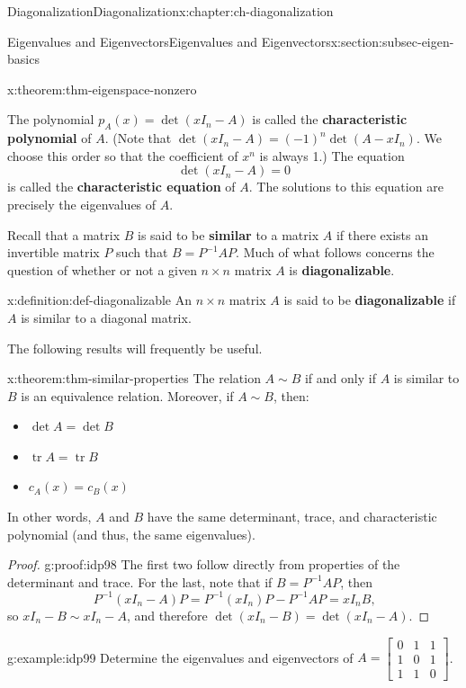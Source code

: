 \documentclass[oneside,10pt,]{book}
\newcommand{\terminology}[1]{\textbf{#1}}
\numberwithin{equation}{section}
\newcommand{\bbm}{\begin{bmatrix}}
\newcommand{\ebm}{\end{bmatrix}}
\newcommand{\tr}{\operatorname{tr}}
\newcommand{\amp}{&}
\begin{document}
\begin{chapterptx}{Diagonalization}{}{Diagonalization}{}{}{x:chapter:ch-diagonalization}
\begin{sectionptx}{Eigenvalues and Eigenvectors}{}{Eigenvalues and Eigenvectors}{}{}{x:section:subsec-eigen-basics}
\begin{theorem}{}{}{x:theorem:thm-eigenspace-nonzero}
%
\end{theorem}
The polynomial \(p_A(x)=\det(xI_n -A)\) is called the \terminology{characteristic polynomial} of \(A\). (Note that \(\det(x I_n-A) = (-1)^n\det(A-x I_n)\). We choose this order so that the coefficient of \(x^n\) is always 1.) The equation%
\begin{equation}
\det(xI_n - A) = 0\label{x:men:eq-characteristic}
\end{equation}
is called the \terminology{characteristic equation} of \(A\). The solutions to this equation are precisely the eigenvalues of \(A\).%
\par
Recall that a matrix \(B\) is said to be \terminology{similar} to a matrix \(A\) if there exists an invertible matrix \(P\) such that \(B = P^{-1}AP\). Much of what follows concerns the question of whether or not a given \(n\times n\) matrix \(A\) is \terminology{diagonalizable}.%
\begin{definition}{}{x:definition:def-diagonalizable}%
An \(n\times n\) matrix \(A\) is said to be \terminology{diagonalizable} if \(A\) is similar to a diagonal matrix.%
\end{definition}
The following results will frequently be useful.%
\begin{theorem}{}{}{x:theorem:thm-similar-properties}%
The relation \(A\sim B\) if and only if \(A\) is similar to \(B\) is an equivalence relation. Moreover, if \(A\sim B\), then:%
\begin{itemize}[label=\textbullet]
\item{}\(\displaystyle \det A = \det B\)%
\item{}\(\displaystyle \tr A = \tr B\)%
\item{}\(\displaystyle c_A(x) = c_B(x)\)%
\end{itemize}
In other words, \(A\) and \(B\) have the same determinant, trace, and characteristic polynomial (and thus, the same eigenvalues).%
\end{theorem}
\begin{proof}{}{g:proof:idp98}
The first two follow directly from properties of the determinant and trace. For the last, note that if \(B = P^{-1}AP\), then%
\begin{equation*}
P^{-1}(xI_n-A)P = P^{-1}(xI_n)P-P^{-1}AP = xI_n B\text{,}
\end{equation*}
so \(xI_n-B\sim xI_n-A\), and therefore \(\det(xI_n-B)=\det(xI_n-A)\).%
\end{proof}
\begin{example}{}{g:example:idp99}%
Determine the eigenvalues and eigenvectors of \(A = \bbm 0\amp 1\amp 1\\1\amp 0\amp 1\\1\amp 1\amp 0\ebm\).%

\end{example}
\end{sectionptx}
\end{chapterptx}
\end{document}
